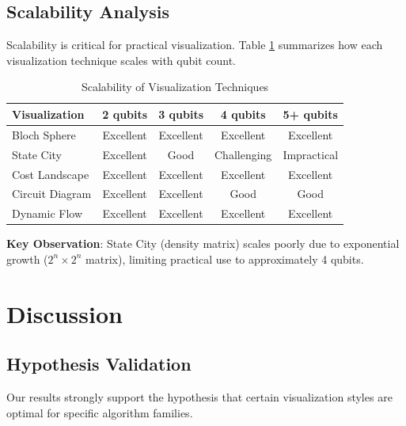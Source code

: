 \documentclass[12pt,a4paper]{article}
\begin{document}
\subsection{Scalability Analysis}

Scalability is critical for practical visualization. Table \ref{tab:scalability} summarizes how each visualization technique scales with qubit count.

\begin{table}[h!]
	\centering
	\caption{Scalability of Visualization Techniques}
	\label{tab:scalability}
	\begin{tabular}{@{}lcccc@{}}
		\toprule
		\textbf{Visualization} & \textbf{2 qubits} & \textbf{3 qubits} & \textbf{4 qubits} & \textbf{5+ qubits} \\ \midrule
		Bloch Sphere           & Excellent         & Excellent         & Excellent         & Excellent          \\
		State City             & Excellent         & Good              & Challenging       & Impractical        \\
		Cost Landscape         & Excellent         & Excellent         & Excellent         & Excellent          \\
		Circuit Diagram        & Excellent         & Excellent         & Good              & Good               \\
		Dynamic Flow           & Excellent         & Excellent         & Excellent         & Excellent          \\ \bottomrule
	\end{tabular}
\end{table}

\textbf{Key Observation}: State City (density matrix) scales poorly due to exponential growth ($2^n \times 2^n$ matrix), limiting practical use to approximately 4 qubits.

\newpage

\section{Discussion}

\subsection{Hypothesis Validation}

Our results strongly support the hypothesis that certain visualization styles are optimal for specific algorithm families.
\end{document}
